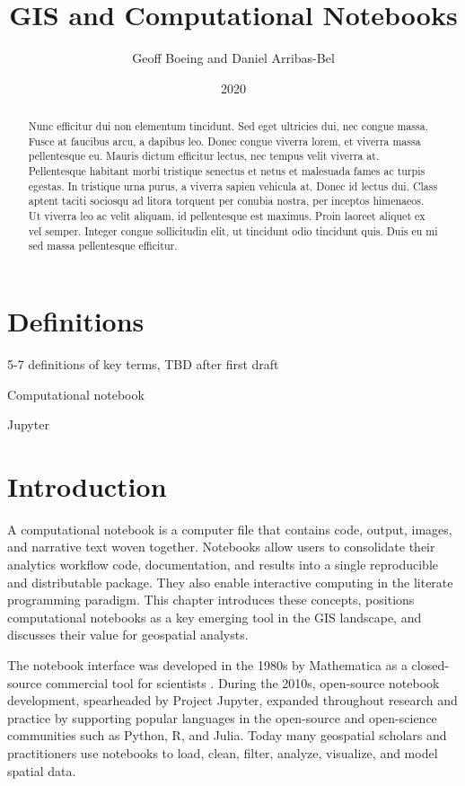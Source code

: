\documentclass[11pt,letterpaper]{article}
\title{GIS and Computational Notebooks}
\author{Geoff Boeing and Daniel Arribas-Bel}
\date{2020}
\begin{document}
\maketitle

\begin{abstract}
Nunc efficitur dui non elementum tincidunt. Sed eget ultricies dui, nec congue massa. Fusce at faucibus arcu, a dapibus leo. Donec congue viverra lorem, et viverra massa pellentesque eu. Mauris dictum efficitur lectus, nec tempus velit viverra at. Pellentesque habitant morbi tristique senectus et netus et malesuada fames ac turpis egestas. In tristique urna purus, a viverra sapien vehicula at. Donec id lectus dui. Class aptent taciti sociosqu ad litora torquent per conubia nostra, per inceptos himenaeos. Ut viverra leo ac velit aliquam, id pellentesque est maximus. Proin laoreet aliquet ex vel semper. Integer congue sollicitudin elit, ut tincidunt odio tincidunt quis. Duis eu mi sed massa pellentesque efficitur.
\end{abstract}

\section*{Definitions}

5-7 definitions of key terms, TBD after first draft

Computational notebook

Jupyter

\section{Introduction}

A computational notebook is a computer file that contains code, output, images, and narrative text woven together. Notebooks allow users to consolidate their analytics workflow code, documentation, and results into a single reproducible and distributable package. They also enable interactive computing in the literate programming paradigm. This chapter introduces these concepts, positions computational notebooks as a key emerging tool in the GIS landscape, and discusses their value for geospatial analysts.

The notebook interface was developed in the 1980s by Mathematica as a closed-source commercial tool for scientists \citep{somers_scientific_2018}. During the 2010s, open-source notebook development, spearheaded by Project Jupyter, expanded throughout research and practice by supporting popular languages in the open-source and open-science communities such as Python, R, and Julia. Today many geospatial scholars and practitioners use notebooks to load, clean, filter, analyze, visualize, and model spatial data.
\end{document}
